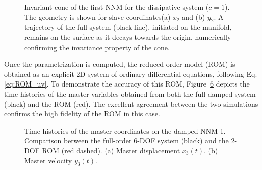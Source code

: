 \documentclass[a4paper,9pt,parskip=half,english]{article}
\theoremstyle{plain}
\theoremstyle{definition}
\begin{document}
\begin{figure}
	\begin{subfigure}{0.49\linewidth}
		\centering
		\caption{}
		\label{fig:NNM1_sldisp_damped_vs_conservative}
	\end{subfigure}
	\begin{subfigure}{0.49\linewidth}
		\centering
		
		\caption{}
		\label{fig:NNM1_slvelo_damped_vs_conservative}
	\end{subfigure}
	\caption{Invariant cone of the first NNM for the dissipative system ($c=1$). The geometry is shown for slave coordinates(a) $x_2$ and (b) $y_2$. A trajectory of the full system (black line), initiated on the manifold, remains on the surface as it decays towards the origin, numerically confirming the invariance property of the cone.}
	\label{fig:NNM1_damped}
\end{figure}
Once the parametrization is computed, the reduced-order model (ROM) is obtained as an explicit 2D system of ordinary differential equations, following Eq. \eqref{eq:ROM_uv}. To demonstrate the accuracy of this ROM, Figure~\ref{fig:NNM1_damped_timehistories} depicts the time histories of the master variables obtained from both the full damped system (black) and the ROM (red). The excellent agreement between the two simulations confirms the high fidelity of the ROM in this case. 
\begin{figure}
	\begin{subfigure}{0.49\linewidth}
		\centering
		\caption{}
		\label{fig:NNM1_damped_timehistory_u}
	\end{subfigure}
	\begin{subfigure}{0.49\linewidth}
		\centering
		
		\caption{}
		\label{fig:NNM1_damped_timehistory_v}
	\end{subfigure}
	\caption{Time histories of the master coordinates on the damped NNM 1. Comparison between the full-order 6-DOF system (black) and the 2-DOF ROM (red dashed). (a) Master displacement $x_3(t)$. (b) Master velocity $y_3(t)$.}
	\label{fig:NNM1_damped_timehistories}
\end{figure}
\end{document}

